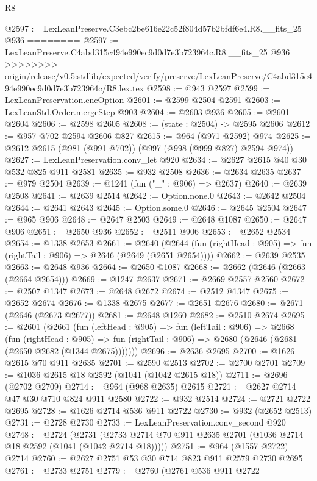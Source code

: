 \begin{lexlean}{R8}
\begin{coremodule}
{{{{{{{{{{{{{{{{{{{{{{{{{{{{{{{{{{{{{{{{{{{{{@2597 := LexLeanPreserve.C3ebc2be616e22c52f804d57b2bfdf6e4.R8.__fits_25 @936
========
@2597 := LexLeanPreserve.C4abd315c494e990ec9d0d7e3b723964c.R8.__fits_25 @936
>>>>>>>> origin/release/v0.5:stdlib/expected/verify/preserve/LexLeanPreserve/C4abd315c494e990ec9d0d7e3b723964c/R8.lex.tex
@2598 := @943 @2597
@2599 := LexLeanPreservation.encOption
@2601 := @2599 @2504 @2591
@2603 := LexLeanStd.Order.mergeStep @903
@2604 := @2603 @936
@2605 := @2601 @2604
@2606 := @2598 @2605
@2608 := (state : @2504) -> @2595 @2606
@2612 := @957 @702 @2594 @2606 @827
@2615 := @964 (@971 @2592) @974
@2625 := @2612 @2615 (@981 (@991 @702)) (@997 (@998 (@999 @827) @2594 @974))
@2627 := LexLeanPreservation.conv_let @920
@2634 := @2627 @2615 @40 @30 @532 @825 @911 @2581
@2635 := @932 @2508
@2636 := @2634 @2635
@2637 := @979 @2504
@2639 := @1241 (fun ("_" : @906) => @2637)
@2640 := @2639 @2508
@2641 := @2639 @2514
@2642 := Option.none.{0}
@2643 := @2642 @2504
@2644 := @2641 @2643
@2645 := Option.some.{0}
@2646 := @2645 @2504
@2647 := @965 @906
@2648 := @2647 @2503
@2649 := @2648 @1087
@2650 := @2647 @906
@2651 := @2650 @936
@2652 := @2511 @906
@2653 := @2652 @2534
@2654 := @1338 @2653
@2661 := @2640
    (@2644 (fun (rightHead : @905) => fun (rightTail : @906) => @2646 (@2649 (@2651 @2654))))
@2662 := @2639 @2535
@2663 := @2648 @936
@2664 := @2650 @1087
@2668 := @2662 (@2646 (@2663 (@2664 @2654)))
@2669 := @1247 @2637
@2671 := @2669 @2557 @2560
@2672 := @2507 @1347
@2673 := @2648 @2672
@2674 := @2512 @1347
@2675 := @2652 @2674
@2676 := @1338 @2675
@2677 := @2651 @2676
@2680 := @2671 (@2646 (@2673 @2677))
@2681 := @2648 @1260
@2682 := @2510 @2674
@2695 := @2601
    (@2661
      (fun (leftHead : @905) =>
      fun (leftTail : @906) =>
      @2668
        (fun (rightHead : @905) =>
        fun (rightTail : @906) => @2680 (@2646 (@2681 (@2650 @2682 (@1344 @2675)))))))
@2696 := @2636 @2695
@2700 := @1626 @2615 @70 @911 @2635
@2701 := @2590 @2513
@2702 := @2700 @2701
@2709 := @1036 @2615 @18 @2592 (@1041 (@1042 @2615 @18))
@2711 := @2696 (@2702 @2709)
@2714 := @964 (@968 @2635) @2615
@2721 := @2627 @2714 @47 @30 @710 @824 @911 @2580
@2722 := @932 @2514
@2724 := @2721 @2722 @2695
@2728 := @1626 @2714 @536 @911 @2722
@2730 := @932 (@2652 @2513)
@2731 := @2728 @2730
@2733 := LexLeanPreservation.conv_second @920
@2748 := @2724
    (@2731 (@2733 @2714 @70 @911 @2635 @2701 (@1036 @2714 @18 @2592 (@1041 (@1042 @2714 @18)))))
@2751 := @964 (@1557 @2722) @2714
@2760 := @2627 @2751 @53 @30 @714 @823 @911 @2579 @2730 @2695
@2761 := @2733 @2751
@2779 := @2760
    (@2761
      @536
      @911
      @2722
}}}}}}}}}}}}}}}}}}}}}}}}}}}}}}}}}}}}}}}}}}}}}
\end{coremodule}
\end{lexlean}
